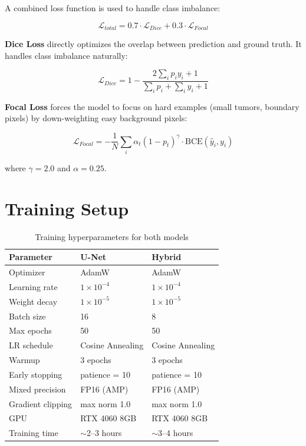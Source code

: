 \documentclass[12pt, a4paper]{article}
\begin{document}
A combined loss function is used to handle class imbalance:

\begin{equation}
    \mathcal{L}_{total} = 0.7 \cdot \mathcal{L}_{Dice} + 0.3 \cdot \mathcal{L}_{Focal}
\end{equation}

\textbf{Dice Loss} \cite{milletari2016} directly optimizes the overlap between prediction and ground truth. It handles class imbalance naturally:

\begin{equation}
    \mathcal{L}_{Dice} = 1 - \frac{2\sum_i p_i y_i + 1}{\sum_i p_i + \sum_i y_i + 1}
\end{equation}

\textbf{Focal Loss} \cite{lin2017} forces the model to focus on hard examples (small tumors, boundary pixels) by down-weighting easy background pixels:

\begin{equation}
    \mathcal{L}_{Focal} = -\frac{1}{N} \sum_i \alpha_t (1 - p_t)^{\gamma} \cdot \text{BCE}(\hat{y}_i, y_i)
\end{equation}

where $\gamma = 2.0$ and $\alpha = 0.25$.

\section{Training Setup}

\begin{table}[H]
    \centering
    \caption{Training hyperparameters for both models}
    \begin{tabular}{lll}
        \toprule
        \textbf{Parameter} & \textbf{U-Net} & \textbf{Hybrid} \\
        \midrule
        Optimizer & AdamW & AdamW \\
        Learning rate & $1 \times 10^{-4}$ & $1 \times 10^{-4}$ \\
        Weight decay & $1 \times 10^{-5}$ & $1 \times 10^{-5}$ \\
        Batch size & 16 & 8 \\
        Max epochs & 50 & 50 \\
        LR schedule & Cosine Annealing & Cosine Annealing \\
        Warmup & 3 epochs & 3 epochs \\
        Early stopping & patience = 10 & patience = 10 \\
        Mixed precision & FP16 (AMP) & FP16 (AMP) \\
        Gradient clipping & max norm 1.0 & max norm 1.0 \\
        GPU & RTX 4060 8GB & RTX 4060 8GB \\
        Training time & $\sim$2--3 hours & $\sim$3--4 hours \\
        \bottomrule
    \end{tabular}
\end{table}
\end{document}
